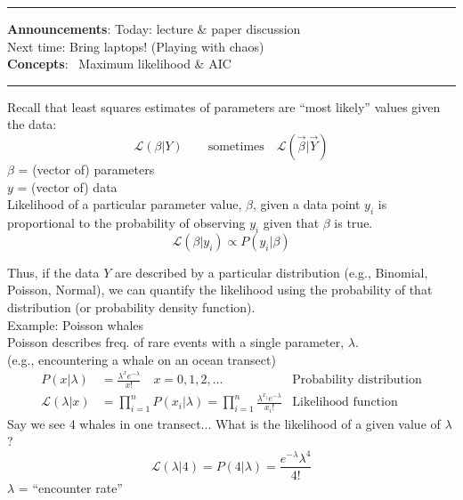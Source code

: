 \documentclass{article}
\newcommand{\ind}{\-\hspace{1cm}}
\begin{document}
\noindent{}

\rule[0.5ex]{\linewidth}{1pt}
\textbf{Announcements}:
\ind Today: lecture \& paper discussion\\
\ind Next time: Bring laptops! (Playing with chaos)\\
\textbf{Concepts}: 
\ind Maximum likelihood \& AIC\\
\rule[0.5ex]{\linewidth}{1pt}
Recall that least squares estimates of parameters are ``most likely'' values given the data:\\
\begin{equation*}
	\mathcal{L}(\beta \vert Y) \quad \quad \text{sometimes} \quad \mathcal{L}(\vec{\beta} \vert \vec{Y})
\end{equation*}
\ind $\beta$ = (vector of) parameters\\
\ind $y$ = (vector of) data\\

Likelihood of a particular parameter value, $\beta$, given a data point $y_i$ is proportional to the probability of observing $y_i$ given that $\beta$ is true.
\begin{equation*}
	\mathcal{L}(\beta \vert y_i) \propto P(y_i\vert \beta)
\end{equation*}

Thus, if the data $Y$ are described by a particular distribution (e.g., Binomial, Poisson, Normal), we can quantify the likelihood using the probability of that distribution (or probability density function).\\

Example:  Poisson whales\\
Poisson describes freq. of rare events with a single parameter, $\lambda$.\\
\ind (e.g., encountering a whale on an ocean transect)
\begin{align*}
	P(x \vert\lambda) & = \frac{\lambda^x e^{-\lambda}}{x!} \quad x=0,1,2,... & \text{Probability distribution}\\
	\mathcal{L}(\lambda \vert x) & = \prod_{i=1}^n P(x_i\vert \lambda) = \prod_{i=1}^{n}\frac{\lambda^{x_i}e^{-\lambda}}{x_i !} & \text{Likelihood function}
\end{align*}
Say we see 4 whales in one transect...
What is the likelihood of a given value of $\lambda$?
\begin{equation*}
	\mathcal{L}(\lambda \vert 4) = P(4 \vert \lambda) = \frac{e^{-\lambda}\lambda^4}{4!}
\end{equation*}
$\lambda$ = ``encounter rate''\\
\end{document}
